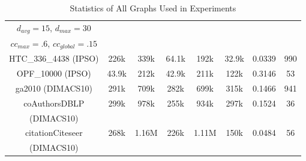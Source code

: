 \documentclass{sig-alternate}
\begin{document}
\begin{table*}[htb!]
{\begin{tabular}{|c|c|c|c|c|c|c|c|}
$d_{avg}=15$, $d_{max}=30$ & & & & & & &\\
$cc_{max}=.6$, $cc_{global}=.15$ & & & & & & &\\\hline
HTC\_336\_4438 (IPSO)& 226k & 339k & 64.1k & 192k & 32.9k & 0.0339 & 990\\\hline
OPF\_10000 (IPSO)& 43.9k & 212k & 42.9k & 211k & 122k & 0.3146 & 53\\\hline
ga2010 (DIMACS10)& 291k & 709k & 282k & 699k & 315k & 0.1466 & 941\\\hline
coAuthorsDBLP & 299k & 978k & 255k & 934k & 297k & 0.1524 & 36\\
(DIMACS10) & & & & & & &\\\hline
citationCiteseer & 268k & 1.16M & 226k & 1.11M & 150k & 0.0484 & 56\\
(DIMACS10) & & & & & & &\\\hline
\end{tabular}}
\caption{Statistics of All Graphs Used in Experiments\label{table:graphsizes}}

\end{table*}
\end{document}

